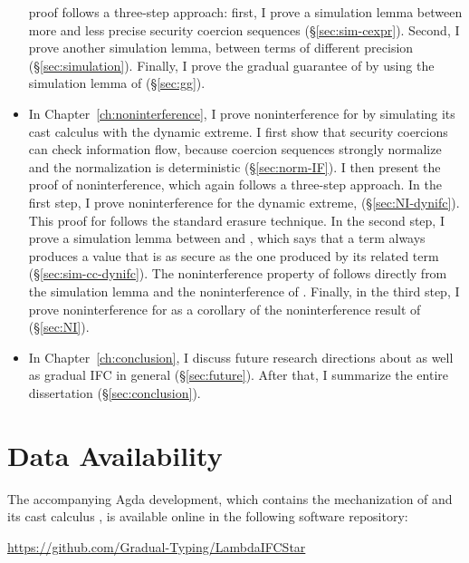 \begin{itemize}
    proof follows a three-step approach: first, I prove a simulation lemma
    between more and less precise security coercion sequences
    (\S\ref{sec:sim-cexpr}). Second, I prove another simulation lemma, between
    \CC terms of different precision (\S\ref{sec:simulation}). Finally, I prove
    the gradual guarantee of \Surface by using the simulation lemma of \CC
    (\S\ref{sec:gg}).
  \item In Chapter~\ref{ch:noninterference}, I prove noninterference for
    \Surface by simulating its cast calculus with the dynamic extreme. I first
    show that security coercions can check information flow, because coercion
    sequences strongly normalize and the normalization is deterministic
    (\S\ref{sec:norm-IF}). I then present the proof of noninterference, which
    again follows a three-step approach. In the first step, I prove
    noninterference for the dynamic extreme, \DynIFC (\S\ref{sec:NI-dynifc}).
    This proof for \DynIFC follows the standard erasure technique. In the second
    step, I prove a simulation lemma between \CC and \DynIFC, which says that a
    \CC term always produces a value that is as secure as the one produced by
    its related \DynIFC term (\S\ref{sec:sim-cc-dynifc}). The noninterference
    property of \CC follows directly from the simulation lemma and the
    noninterference of \DynIFC. Finally, in the third step, I prove
    noninterference for \Surface as a corollary of the noninterference result of
    \CC (\S\ref{sec:NI}).
  \item In Chapter~\ref{ch:conclusion}, I discuss future research directions
    about \Surface as well as gradual IFC in general (\S\ref{sec:future}). After
    that, I summarize the entire dissertation (\S\ref{sec:conclusion}).
\end{itemize}

\section{Data Availability}
\label{sec:code-repo}

The accompanying Agda development, which contains the mechanization of \Surface and its
cast calculus \CC, is available online in the following software repository:
\begin{center}
  \large
  \url{https://github.com/Gradual-Typing/LambdaIFCStar}
\end{center}

